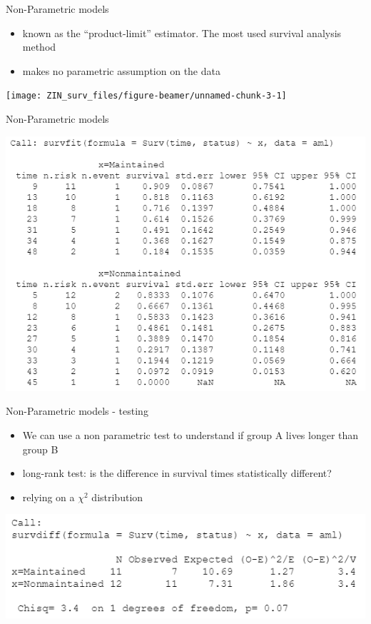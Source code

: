 \documentclass[
  ignorenonframetext,
]{beamer}
\providecommand{\tightlist}{%
  \setlength{\itemsep}{0pt}\setlength{\parskip}{0pt}}
\begin{document}
\begin{frame}{Non-Parametric models}
\protect\hypertarget{non-parametric-models}{}

\begin{itemize}
\tightlist
\item
  known as the ``product-limit'' estimator. The most used survival
  analysis method
\item
  makes no parametric assumption on the data
\end{itemize}

\texttt{[image: ZIN\_surv\_files/figure-beamer/unnamed-chunk-3-1]}

\end{frame}

\begin{frame}{Non-Parametric models}
\protect\hypertarget{non-parametric-models-1}{}

\includegraphics[width=1\linewidth]{figures/leukemia.surv_output}

\end{frame}

\begin{frame}{Non-Parametric models - testing}
\protect\hypertarget{non-parametric-models---testing}{}

\begin{itemize}
\item
  We can use a non parametric test to understand if group A lives longer
  than group B
\item
  long-rank test: is the difference in survival times statistically
  different?
\item
  relying on a \(\chi^2\) distribution
\end{itemize}

\includegraphics[width=1\linewidth]{figures/survdiff}

\end{frame}
\end{document}
